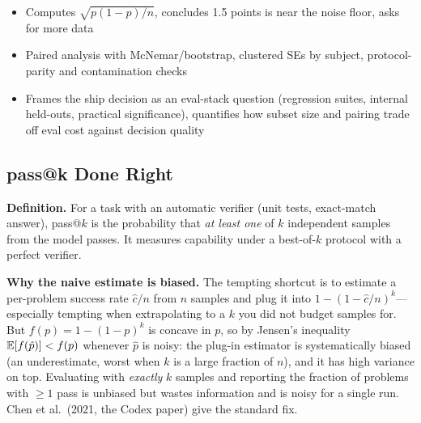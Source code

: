 \begin{interviewq}

\goodgreat
\begin{itemize}
    \item {} Computes $\sqrt{p(1-p)/n}$, concludes 1.5 points is near the noise floor, asks for more data
    \item {} Paired analysis with McNemar/bootstrap, clustered SEs by subject, protocol-parity and contamination checks
    \item {} Frames the ship decision as an eval-stack question (regression suites, internal held-outs, practical significance), quantifies how subset size and pairing trade off eval cost against decision quality
\end{itemize}

\end{interviewq}

\subsection{pass@k Done Right}
\label{sec:pass_at_k}

\textbf{Definition.} For a task with an automatic verifier (unit tests, exact-match answer), pass@$k$ is the probability that \textit{at least one} of $k$ independent samples from the model passes. It measures capability under a best-of-$k$ protocol with a perfect verifier.

\textbf{Why the naive estimate is biased.} The tempting shortcut is to estimate a per-problem success rate $\hat{c}/n$ from $n$ samples and plug it into $1 - (1 - \hat{c}/n)^k$---especially tempting when extrapolating to a $k$ you did not budget samples for. But $f(p) = 1 - (1-p)^k$ is concave in $p$, so by Jensen's inequality $\operatorname{\mathbb{E}}[f(\hat{p})] < f(p)$ whenever $\hat{p}$ is noisy: the plug-in estimator is systematically biased (an underestimate, worst when $k$ is a large fraction of $n$), and it has high variance on top. Evaluating with \textit{exactly} $k$ samples and reporting the fraction of problems with $\geq 1$ pass is unbiased but wastes information and is noisy for a single run. Chen et al.\ (2021, the Codex paper) give the standard fix.

